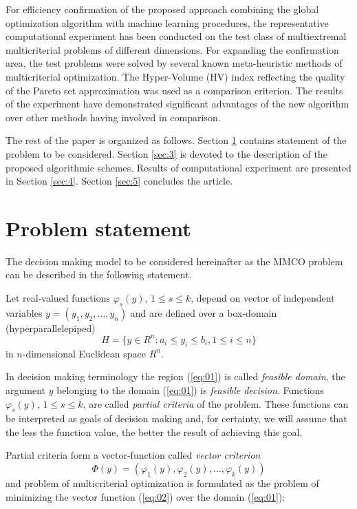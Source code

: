 \documentclass[runningheads]{llncs}
\begin{document}
For efficiency confirmation of the proposed approach combining the global optimization algorithm with machine learning procedures, the representative computational experiment has been conducted on the test class of multiextremal multicriterial problems of different dimensions. For expanding the confirmation area, the test problems were solved by several known meta-heuristic methods of multicriterial optimization. The Hyper-Volume (HV) index reflecting the quality of the Pareto set approximation was used as a comparison criterion. The results of the experiment have demonstrated significant advantages of the new algorithm over other methods having involved in comparison.

The rest of the paper is organized as follows. Section \ref{sec:2} contains statement of the problem to be considered. Section \ref{sec:3} is devoted to the description of the proposed algorithmic schemes.  Results of computational experiment are presented in Section \ref{sec:4}. Section \ref{sec:5} concludes the article.

\section{Problem statement}\label{sec:2}

The decision making model to be considered hereinafter as the MMCO problem can be described in the following statement.

Let real-valued functions $\varphi_s(y)$, $1 \leq s \leq k$, depend on vector of independent variables 
$y=(y_1, y_2, \dots, y_n)$ and are defined over a box-domain (hyperparallelepiped)
\begin{equation}
\label{eq:01}
    H=\{y \in R^n : a_i \leq y_i \leq b_i, 1 \leq i \leq n\}
\end{equation}                                      in $n$-dimensional Euclidean space $R^n$.

In decision making terminology the region (\ref{eq:01}) is called \textit{feasible domain}, the argument $y$ belonging to the domain (\ref{eq:01}) is \textit{feasible decision}.  Functions  $\varphi_s(y)$, $1 \leq s \leq k$, are called \textit{partial criteria} of the problem. These functions can be interpreted as goals of decision making and, for certainty, we will assume that the less the function value, the better the result of achieving this goal.

Partial criteria form a vector-function called \textit{vector criterion}
\begin{equation}
\label{eq:02}
    \Phi(y) = (\varphi_1(y), \varphi_2(y), \dots, \varphi_k(y))
\end{equation}
and problem of multicriterial optimization is formulated as the problem of minimizing the vector function (\ref{eq:02}) over the domain (\ref{eq:01}):
\end{document}
